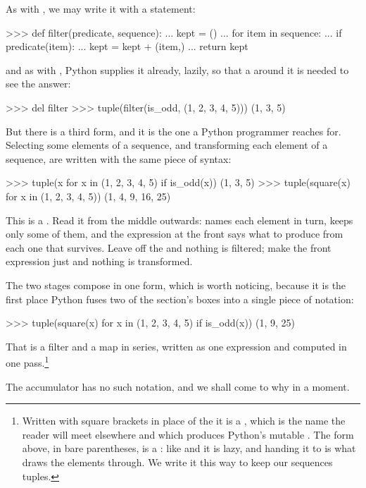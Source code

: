 \noindent
\begin{revealTheSurface}
As with , we may write it with a  statement:

\begin{codeBlock}
>>> def filter(predicate, sequence):
...     kept = ()
...     for item in sequence:
...         if predicate(item):
...             kept = kept + (item,)
...     return kept
\end{codeBlock}

\noindent
and as with , Python supplies it already, lazily, so that a
 around it is needed to see the answer:

\begin{codeBlock}
>>> del filter
>>> tuple(filter(is_odd, (1, 2, 3, 4, 5)))
(1, 3, 5)
\end{codeBlock}

\noindent
But there is a third form, and it is the one a Python programmer reaches for.
Selecting some elements of a sequence, and transforming each element of a
sequence, are written with the same piece of syntax:

\begin{codeBlock}
>>> tuple(x for x in (1, 2, 3, 4, 5) if is_odd(x))
(1, 3, 5)
>>> tuple(square(x) for x in (1, 2, 3, 4, 5))
(1, 4, 9, 16, 25)
\end{codeBlock}

\noindent
This is a .  Read it from the middle outwards:  names each element in turn,  keeps
only some of them, and the expression at the front says what to produce from
each one that survives.  Leave off the  and nothing is filtered; make
the front expression just  and nothing is transformed.

The two stages compose in one form, which is worth noticing, because it is the
first place Python fuses two of the section's boxes into a single piece of
notation:

\begin{codeBlock}
>>> tuple(square(x) for x in (1, 2, 3, 4, 5) if is_odd(x))
(1, 9, 25)
\end{codeBlock}

\noindent
That is a filter and a map in series, written as one expression and computed in
one pass.\footnote{Written with square brackets in place of the  it is a , which is the name the reader
will meet elsewhere and which produces Python's mutable .  The form
above, in bare parentheses, is a : like
 and  it is lazy, and handing it to  is what
draws the elements through.  We write it this way to keep our sequences
tuples.}

The accumulator has no such notation, and we shall come to why in a moment.
\end{revealTheSurface}

